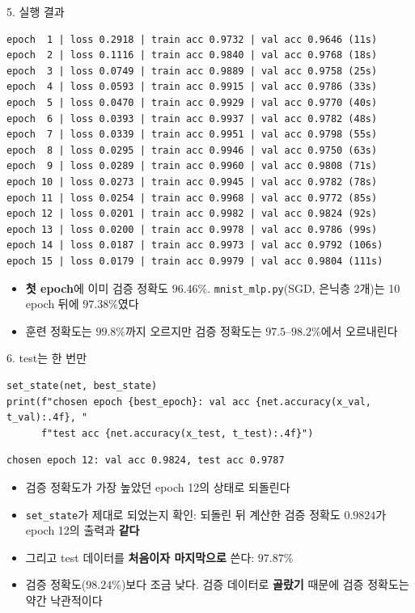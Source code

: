 \documentclass[aspectratio=169,11pt]{beamer}
\newcommand{\codesmall}{\ttfamily\fontsize{7.4}{8.3}\selectfont}
\newcommand{\code}[1]{\texttt{#1}}
\begin{document}
\begin{frame}[fragile]{5. 실행 결과}
\begin{lstlisting}[style=outstyle,basicstyle=\codesmall]
epoch  1 | loss 0.2918 | train acc 0.9732 | val acc 0.9646 (11s)
epoch  2 | loss 0.1116 | train acc 0.9840 | val acc 0.9768 (18s)
epoch  3 | loss 0.0749 | train acc 0.9889 | val acc 0.9758 (25s)
epoch  4 | loss 0.0593 | train acc 0.9915 | val acc 0.9786 (33s)
epoch  5 | loss 0.0470 | train acc 0.9929 | val acc 0.9770 (40s)
epoch  6 | loss 0.0393 | train acc 0.9937 | val acc 0.9782 (48s)
epoch  7 | loss 0.0339 | train acc 0.9951 | val acc 0.9798 (55s)
epoch  8 | loss 0.0295 | train acc 0.9946 | val acc 0.9750 (63s)
epoch  9 | loss 0.0289 | train acc 0.9960 | val acc 0.9808 (71s)
epoch 10 | loss 0.0273 | train acc 0.9945 | val acc 0.9782 (78s)
epoch 11 | loss 0.0254 | train acc 0.9968 | val acc 0.9772 (85s)
epoch 12 | loss 0.0201 | train acc 0.9982 | val acc 0.9824 (92s)
epoch 13 | loss 0.0200 | train acc 0.9978 | val acc 0.9786 (99s)
epoch 14 | loss 0.0187 | train acc 0.9973 | val acc 0.9792 (106s)
epoch 15 | loss 0.0179 | train acc 0.9979 | val acc 0.9804 (111s)
\end{lstlisting}
\small
\begin{itemize}
\item \textbf{첫 epoch}에 이미 검증 정확도 $96.46\%$. \code{mnist\_mlp.py}(SGD, 은닉층 2개)는 10 epoch 뒤에 $97.38\%$였다
\item 훈련 정확도는 $99.8\%$까지 오르지만 검증 정확도는 $97.5$--$98.2\%$에서 오르내린다
\end{itemize}
\end{frame}

\begin{frame}[fragile]{6. test는 한 번만}
\begin{lstlisting}
set_state(net, best_state)
print(f"chosen epoch {best_epoch}: val acc {net.accuracy(x_val, t_val):.4f}, "
      f"test acc {net.accuracy(x_test, t_test):.4f}")
\end{lstlisting}
\begin{lstlisting}[style=outstyle]
chosen epoch 12: val acc 0.9824, test acc 0.9787
\end{lstlisting}
\begin{itemize}
\item 검증 정확도가 가장 높았던 epoch 12의 상태로 되돌린다
\item \code{set\_state}가 제대로 되었는지 확인: 되돌린 뒤 계산한 검증 정확도 $0.9824$가 epoch 12의 출력과 \textbf{같다}
\item 그리고 test 데이터를 \textbf{처음이자 마지막으로} 쓴다: $97.87\%$
\item 검증 정확도($98.24\%$)보다 조금 낮다. 검증 데이터로 \textbf{골랐기} 때문에 검증 정확도는 약간 낙관적이다
\end{itemize}
\end{frame}
\end{document}
